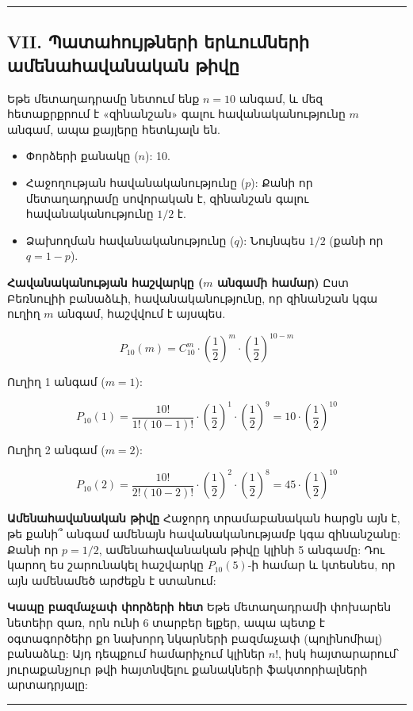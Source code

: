 \documentclass[12pt, a4paper]{article}
\begin{document}
\vspace{1em}
\hrule
\vspace{1em}

\subsection{\textbf{VII. Պատահույթների երևումների ամենահավանական թիվը}}

Եթե մետաղադրամը նետում ենք $n=10$ անգամ, և մեզ հետաքրքրում է «զինանշան» գալու հավանականությունը $m$ անգամ, ապա քայլերը հետևյալն են.

\begin{itemize}
    \item Փորձերի քանակը ($n$): 10.
    \item Հաջողության հավանականությունը ($p$): Քանի որ մետաղադրամը սովորական է, զինանշան գալու հավանականությունը $1/2$ է.
    \item Ձախողման հավանականությունը ($q$): Նույնպես $1/2$ (քանի որ $q = 1 - p$).
\end{itemize}

\textbf{Հավանականության հաշվարկը ($m$ անգամի համար)}
Ըստ Բեռնուլիի բանաձևի, հավանականությունը, որ զինանշան կգա ուղիղ $m$ անգամ, հաշվվում է այսպես.

$$P_{10}(m) = C_{10}^m \cdot \left(\frac{1}{2}\right)^m \cdot \left(\frac{1}{2}\right)^{10-m}$$

Ուղիղ 1 անգամ ($m=1$):

$$P_{10}(1) = \frac{10!}{1!(10-1)!} \cdot \left(\frac{1}{2}\right)^1 \cdot \left(\frac{1}{2}\right)^9 = 10 \cdot \left(\frac{1}{2}\right)^{10}$$

Ուղիղ 2 անգամ ($m=2$):

$$P_{10}(2) = \frac{10!}{2!(10-2)!} \cdot \left(\frac{1}{2}\right)^2 \cdot \left(\frac{1}{2}\right)^8 = 45 \cdot \left(\frac{1}{2}\right)^{10}$$

\textbf{Ամենահավանական թիվը}
Հաջորդ տրամաբանական հարցն այն է, թե քանի՞ անգամ ամենայն հավանականությամբ կգա զինանշանը: Քանի որ $p=1/2$, ամենահավանական թիվը կլինի 5 անգամը: Դու կարող ես շարունակել հաշվարկը $P_{10}(5)$-ի համար և կտեսնես, որ այն ամենամեծ արժեքն է ստանում:

\textbf{Կապը բազմաչափ փորձերի հետ}
Եթե մետաղադրամի փոխարեն նետեիր զառ, որն ունի 6 տարբեր ելքեր, ապա պետք է օգտագործեիր քո նախորդ նկարների բազմաչափ (պոլինոմիալ) բանաձևը: Այդ դեպքում համարիչում կլիներ $n!$, իսկ հայտարարում՝ յուրաքանչյուր թվի հայտնվելու քանակների ֆակտորիալների արտադրյալը:

\vspace{1em}
\hrule
\vspace{1em}
\end{document}
